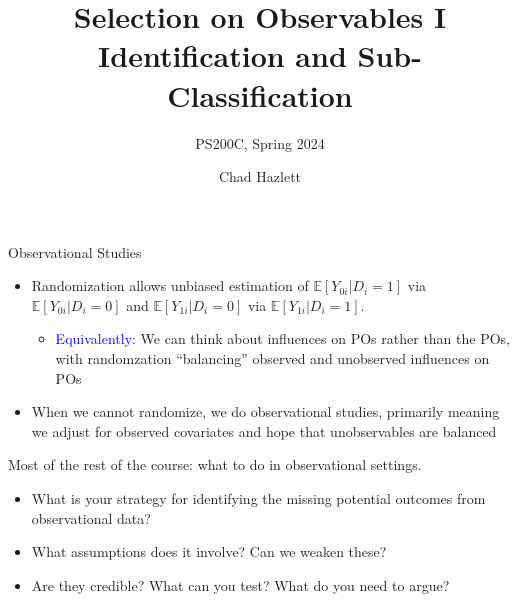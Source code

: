 \documentclass[xcolor=dvipsnames]{beamer}
\title[]{Selection on Observables I \\ \small Identification and Sub-Classification}
\subtitle[ ]{PS200C, Spring 2024}
\author[Hazlett]{Chad Hazlett }
\institute[UCLA]{UCLA\\[1ex]
  \texttt{chazlett@ucla.edu}
}
\date{}
\newcommand\E{\mathbb{E}}
\begin{document}
\subject{Talks}


\begin{frame}
  \titlepage
\end{frame}


\begin{frame}{Observational Studies}
\small
\begin{itemize}
\itemsep1pt\parskip5pt
\item Randomization allows unbiased estimation of $\E[Y_{0i}|D_i=1]$ via $\E[Y_{0i}|D_i=0]$ and $\E[Y_{1i}|D_i=0]$ via $\E[Y_{1i}|D_i=1]$.
\begin{itemize}
\footnotesize
\item<2->[] \textcolor{Blue}{Equivalently}: We can think about influences on POs rather than the POs, with randomzation ``balancing'' \alert{observed} and \alert{unobserved} influences on POs 
\end{itemize}
\small
\item<3-> When we cannot randomize, we do observational studies, primarily meaning we \alert{adjust} for \alert{observed covariates} and \alert{hope} that unobservables are balanced 
\end{itemize}
\bigskip
{} Most of the rest of the course: what to do in observational settings. 
\footnotesize
\begin{itemize}
\item<5-> What is your strategy for identifying the missing potential outcomes from observational data? 
\item<5-> What assumptions does it involve? Can we weaken these?
\item<5-> Are they credible? What can you test? What do you need to argue? 
\end{itemize}
\end{frame}
\end{document}
